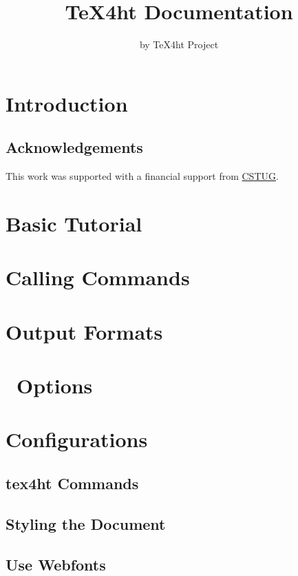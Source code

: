 \documentclass{book}
\title{TeX4ht Documentation}
\author{by TeX4ht Project}
\begin{document}
\maketitle

\ifdefined\HCode\else\tableofcontents\fi


\chapter{Introduction}

\section{Acknowledgements}

This work was supported with a financial support from \href{https://cstug.cz/}{CSTUG}.

\chapter{Basic Tutorial}
\chapter{Calling Commands}

\label{sec:calling-commands}
\chapter{Output Formats}
\chapter{\texfourht\ Options}



\chapter{Configurations}

\section{tex4ht Commands}

\section{Styling the Document}

\section{Use Webfonts}

\end{document}
